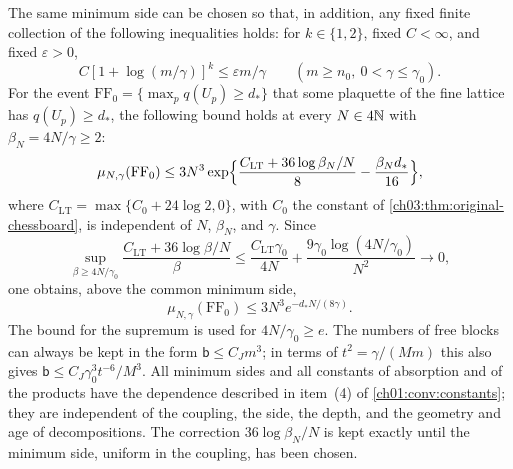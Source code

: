 \begin{lemma}
The same minimum side can be chosen so that, in addition, any fixed finite collection of the following inequalities holds: for $k\in\{1,2\}$, fixed $C<\infty$, and fixed $\varepsilon>0$,
\[
 C[1+\log(m/\gamma)]^k\le\varepsilon m/\gamma\qquad(m\ge n_0,\ 0<\gamma\le\gamma_0).
\]
For the event $\mathrm{FF}_0=\{\max_pq(U_p)\ge d_*\}$ that some plaquette of the fine lattice has $q(U_p)\ge d_*$, the following bound holds at every $N\in4\mathbb N$ with $\beta_N=4N/\gamma\ge2$:
\[
 \mu_{N,\gamma}(\mathrm{FF}_0)\le3N^3\exp\Bigl\{\frac{C_{\mathrm{LT}}+36\log\beta_N/N}{8}-\frac{\beta_Nd_*}{16}\Bigr\},
\]
where $C_{\mathrm{LT}}=\max\{C_0+24\log2,0\}$, with $C_0$ the constant of \cref{ch03:thm:original-chessboard}, is independent of $N$, $\beta_N$, and $\gamma$. Since
\[
 \sup_{\beta\ge4N/\gamma_0}\frac{C_{\mathrm{LT}}+36\log\beta/N}{\beta}\le\frac{C_{\mathrm{LT}}\gamma_0}{4N}+\frac{9\gamma_0\log(4N/\gamma_0)}{N^2}\longrightarrow0,
\]
one obtains, above the common minimum side,
\[
 \mu_{N,\gamma}(\mathrm{FF}_0)\le3N^3e^{-d_*N/(8\gamma)}.
\]
The bound for the supremum is used for $4N/\gamma_0\ge e$. The numbers of free blocks can always be kept in the form $\mathsf b\le C_Jm^3$; in terms of $t^2=\gamma/(Mm)$ this also gives $\mathsf b\le C_J\gamma_0^3t^{-6}/M^3$. All minimum sides and all constants of absorption and of the products have the dependence described in item~(4) of \cref{ch01:conv:constants}; they are independent of the coupling, the side, the depth, and the geometry and age of decompositions. The correction $36\log\beta_N/N$ is kept exactly until the minimum side, uniform in the coupling, has been chosen.
\end{lemma}

